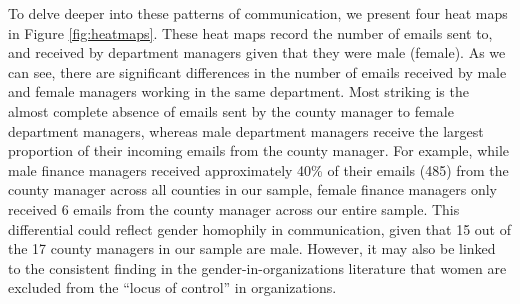 \documentclass{pnastwo}
\begin{document}
\begin{article}
To delve deeper into these patterns of communication, we present four heat maps in Figure \ref{fig:heatmaps}. These heat maps record the number of emails sent to, and received by department managers given that they were male (female). As we can see, there are significant differences in the number of emails received by male and female managers working in the same department. Most striking is the almost complete absence of emails sent by the county manager to female department managers, whereas male department managers receive the largest proportion of their incoming emails from the county manager. For example, while male finance managers received approximately 40\% of their emails (485) from the county manager across all counties in our sample, female finance managers only received 6 emails from the county manager across our entire sample. This differential could reflect gender homophily in communication, given that 15 out of the 17 county managers in our sample are male. However, it may also be linked to the consistent finding in the gender-in-organizations literature that women are excluded from the ``locus of control'' in organizations. 




\end{article}
\end{document}

